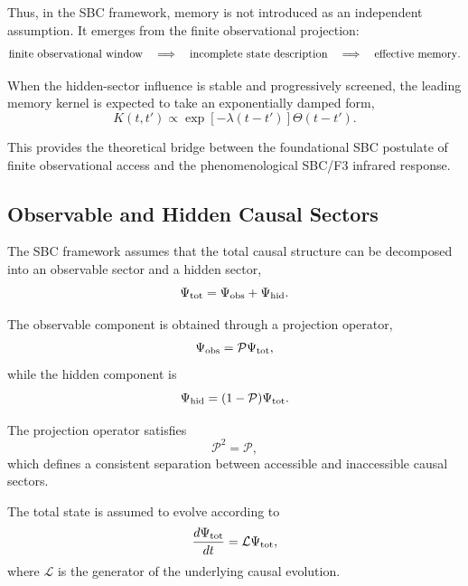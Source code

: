 Thus, in the SBC framework, memory is not introduced as an independent assumption. It emerges from the finite observational projection:
\begin{equation}
{\rm finite\ observational\ window}
\quad
\Longrightarrow
\quad
{\rm incomplete\ state\ description}
\quad
\Longrightarrow
\quad
{\rm effective\ memory}.
\end{equation}

When the hidden-sector influence is stable and progressively screened, the leading memory kernel is expected to take an exponentially damped form,
\begin{equation}
K(t,t')
\propto
\exp[-\lambda(t-t')]\Theta(t-t').
\end{equation}

This provides the theoretical bridge between the foundational SBC postulate of finite observational access and the phenomenological SBC/F3 infrared response.

\subsection{Observable and Hidden Causal Sectors}

The SBC framework assumes that the total causal structure can be decomposed into an observable sector and a hidden sector,
\begin{equation}
\Psi_{\rm tot}
=
\Psi_{\rm obs}
+
\Psi_{\rm hid}.
\end{equation}

The observable component is obtained through a projection operator,
\begin{equation}
\Psi_{\rm obs}
=
\mathcal P \Psi_{\rm tot},
\end{equation}
while the hidden component is
\begin{equation}
\Psi_{\rm hid}
=
(1-\mathcal P)\Psi_{\rm tot}.
\end{equation}

The projection operator satisfies
\begin{equation}
\mathcal P^2=\mathcal P,
\end{equation}
which defines a consistent separation between accessible and inaccessible causal sectors.

The total state is assumed to evolve according to
\begin{equation}
\frac{d\Psi_{\rm tot}}{dt}
=
\mathcal L \Psi_{\rm tot},
\end{equation}
where \(\mathcal L\) is the generator of the underlying causal evolution.

